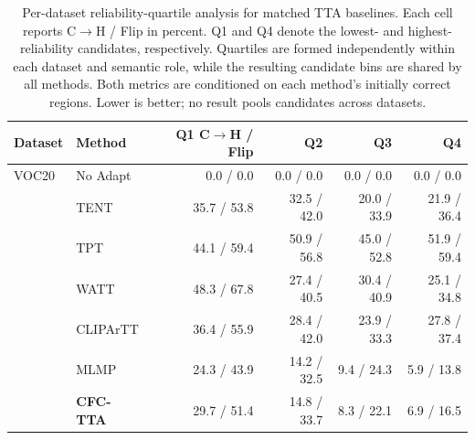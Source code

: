 \begin{table}[t]
\centering
\scriptsize
\setlength{\tabcolsep}{4pt}
\caption{Per-dataset reliability-quartile analysis for matched TTA baselines. Each cell reports C$\rightarrow$H / Flip in percent. Q1 and Q4 denote the lowest- and highest-reliability candidates, respectively. Quartiles are formed independently within each dataset and semantic role, while the resulting candidate bins are shared by all methods. Both metrics are conditioned on each method's initially correct regions. Lower is better; no result pools candidates across datasets.}
\label{tab:baseline-reliability-quartiles-per-dataset}
\begin{tabular}{llrrrr}
\toprule
Dataset & Method & Q1 C$\rightarrow$H / Flip & Q2 & Q3 & Q4 \\
\midrule
VOC20 & No Adapt & 0.0 / 0.0 & 0.0 / 0.0 & 0.0 / 0.0 & 0.0 / 0.0 \\
 & TENT & 35.7 / 53.8 & 32.5 / 42.0 & 20.0 / 33.9 & 21.9 / 36.4 \\
 & TPT & 44.1 / 59.4 & 50.9 / 56.8 & 45.0 / 52.8 & 51.9 / 59.4 \\
 & WATT & 48.3 / 67.8 & 27.4 / 40.5 & 30.4 / 40.9 & 25.1 / 34.8 \\
 & CLIPArTT & 36.4 / 55.9 & 28.4 / 42.0 & 23.9 / 33.3 & 27.8 / 37.4 \\
 & MLMP & 24.3 / 43.9 & 14.2 / 32.5 & 9.4 / 24.3 & 5.9 / 13.8 \\
 & \textbf{CFC-TTA} & 29.7 / 51.4 & 14.8 / 33.7 & 8.3 / 22.1 & 6.9 / 16.5 \\
\bottomrule
\end{tabular}
\end{table}
